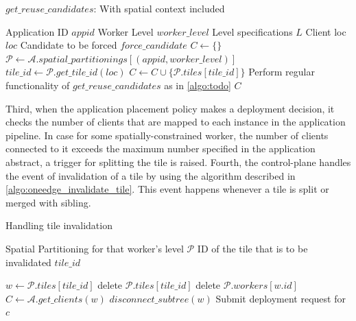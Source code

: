 \begin{algorithm}
\caption{$get\_reuse\_candidates$: With spatial context included}
\begin{algorithmic}[1]
\Require Application ID $appid$
\Require Worker Level $worker\_level$
\Require Level specifications $L$
\Require Client loc $loc$
\Require Candidate to be forced $force\_candidate$
\State $C \gets \{\}$
    \State $\mathcal{P} \gets \mathcal{A}.spatial\_partitionings[\left( appid, worker\_level\right)]$
    \State $tile\_id \gets \mathcal{P}.get\_tile\_id \left( loc \right)$
            \State $C \gets C \cup \{ \mathcal{P}.tiles[tile\_id] \}$
        \EndIf
    \EndIf
\Else
    \State Perform regular functionality of $get\_reuse\_candidates$ as in \cref{algo:todo}
\EndIf
\State \Return $C$
\end{algorithmic}
\end{algorithm}
Third, when the application placement policy makes a deployment decision, it checks the number of clients that are mapped to each instance in the application pipeline. In case for some spatially-constrained worker, the number of clients connected to it exceeds the maximum number specified in the application abstract, a trigger for splitting the tile is raised. Fourth, the control-plane handles the event of invalidation of a tile by using the algorithm described in \cref{algo:oneedge_invalidate_tile}. This event happens whenever a tile is split or merged with sibling.

\begin{algorithm}
\caption{Handling tile invalidation}
\label{algo:oneedge_invalidate_tile}
\begin{algorithmic}[1]
\Require Spatial Partitioning for that worker's level $\mathcal{P}$
\Require ID of the tile that is to be invalidated $tile\_id$

\State $w \gets \mathcal{P}.tiles [tile\_id]$
\State delete $\mathcal{P}.tiles[tile\_id]$
\State delete $\mathcal{P}.workers[w.id]$
\State $C \gets \mathcal{A}.get\_clients \left( w \right)$ 
\State $disconnect\_subtree \left( w \right)$ 
    \State Submit deployment request for $c$
\EndFor
\end{algorithmic}
\end{algorithm}


